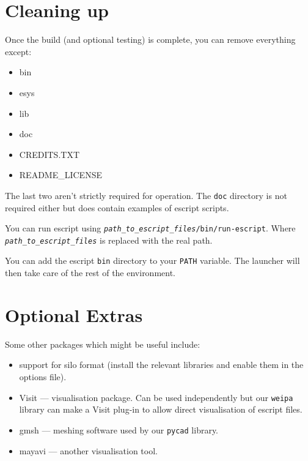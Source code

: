 \section{Cleaning up}
\label{sec:cleanup}

Once the build (and optional testing) is complete, you can remove everything except:
\begin{itemize}
 \item bin
 \item esys
 \item lib
 \item doc
 \item CREDITS.TXT
 \item README_LICENSE
\end{itemize}
The last two aren't strictly required for operation.
The \texttt{doc} directory is not required either but does contain examples of escript scripts.

You can run escript using \texttt{\textit{path_to_escript_files}/bin/run-escript}.
Where \texttt{\textit{path_to_escript_files}} is replaced with the real path.

\begin{optionalstep}
You can add the escript \texttt{bin} directory to your \texttt{PATH} variable.
The launcher will then take care of the rest of the environment.
\end{optionalstep}

\section{Optional Extras}

Some other packages which might be useful include:
\begin{itemize}
 \item support for silo format (install the relevant libraries and enable them in the options file).
 \item Visit --- visualisation package. Can be used independently but our \texttt{weipa} library can make a Visit 
plug-in to allow direct visualisation of escript files.
 \item gmsh --- meshing software used by our \texttt{pycad} library.
 \item mayavi --- another visualisation tool.
\end{itemize}








